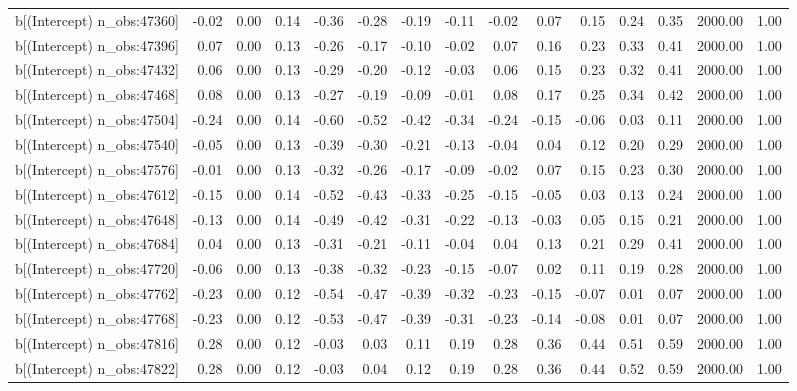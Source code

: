 \begin{table}[ht]
\begin{tabular}{rrrrrrrrrrrrrrr}
  b[(Intercept) n\_obs:47360] & -0.02 & 0.00 & 0.14 & -0.36 & -0.28 & -0.19 & -0.11 & -0.02 & 0.07 & 0.15 & 0.24 & 0.35 & 2000.00 & 1.00 \\ 
  b[(Intercept) n\_obs:47396] & 0.07 & 0.00 & 0.13 & -0.26 & -0.17 & -0.10 & -0.02 & 0.07 & 0.16 & 0.23 & 0.33 & 0.41 & 2000.00 & 1.00 \\ 
  b[(Intercept) n\_obs:47432] & 0.06 & 0.00 & 0.13 & -0.29 & -0.20 & -0.12 & -0.03 & 0.06 & 0.15 & 0.23 & 0.32 & 0.41 & 2000.00 & 1.00 \\ 
  b[(Intercept) n\_obs:47468] & 0.08 & 0.00 & 0.13 & -0.27 & -0.19 & -0.09 & -0.01 & 0.08 & 0.17 & 0.25 & 0.34 & 0.42 & 2000.00 & 1.00 \\ 
  b[(Intercept) n\_obs:47504] & -0.24 & 0.00 & 0.14 & -0.60 & -0.52 & -0.42 & -0.34 & -0.24 & -0.15 & -0.06 & 0.03 & 0.11 & 2000.00 & 1.00 \\ 
  b[(Intercept) n\_obs:47540] & -0.05 & 0.00 & 0.13 & -0.39 & -0.30 & -0.21 & -0.13 & -0.04 & 0.04 & 0.12 & 0.20 & 0.29 & 2000.00 & 1.00 \\ 
  b[(Intercept) n\_obs:47576] & -0.01 & 0.00 & 0.13 & -0.32 & -0.26 & -0.17 & -0.09 & -0.02 & 0.07 & 0.15 & 0.23 & 0.30 & 2000.00 & 1.00 \\ 
  b[(Intercept) n\_obs:47612] & -0.15 & 0.00 & 0.14 & -0.52 & -0.43 & -0.33 & -0.25 & -0.15 & -0.05 & 0.03 & 0.13 & 0.24 & 2000.00 & 1.00 \\ 
  b[(Intercept) n\_obs:47648] & -0.13 & 0.00 & 0.14 & -0.49 & -0.42 & -0.31 & -0.22 & -0.13 & -0.03 & 0.05 & 0.15 & 0.21 & 2000.00 & 1.00 \\ 
  b[(Intercept) n\_obs:47684] & 0.04 & 0.00 & 0.13 & -0.31 & -0.21 & -0.11 & -0.04 & 0.04 & 0.13 & 0.21 & 0.29 & 0.41 & 2000.00 & 1.00 \\ 
  b[(Intercept) n\_obs:47720] & -0.06 & 0.00 & 0.13 & -0.38 & -0.32 & -0.23 & -0.15 & -0.07 & 0.02 & 0.11 & 0.19 & 0.28 & 2000.00 & 1.00 \\ 
  b[(Intercept) n\_obs:47762] & -0.23 & 0.00 & 0.12 & -0.54 & -0.47 & -0.39 & -0.32 & -0.23 & -0.15 & -0.07 & 0.01 & 0.07 & 2000.00 & 1.00 \\ 
  b[(Intercept) n\_obs:47768] & -0.23 & 0.00 & 0.12 & -0.53 & -0.47 & -0.39 & -0.31 & -0.23 & -0.14 & -0.08 & 0.01 & 0.07 & 2000.00 & 1.00 \\ 
  b[(Intercept) n\_obs:47816] & 0.28 & 0.00 & 0.12 & -0.03 & 0.03 & 0.11 & 0.19 & 0.28 & 0.36 & 0.44 & 0.51 & 0.59 & 2000.00 & 1.00 \\ 
  b[(Intercept) n\_obs:47822] & 0.28 & 0.00 & 0.12 & -0.03 & 0.04 & 0.12 & 0.19 & 0.28 & 0.36 & 0.44 & 0.52 & 0.59 & 2000.00 & 1.00 \\ 

\end{tabular}
\end{table}
